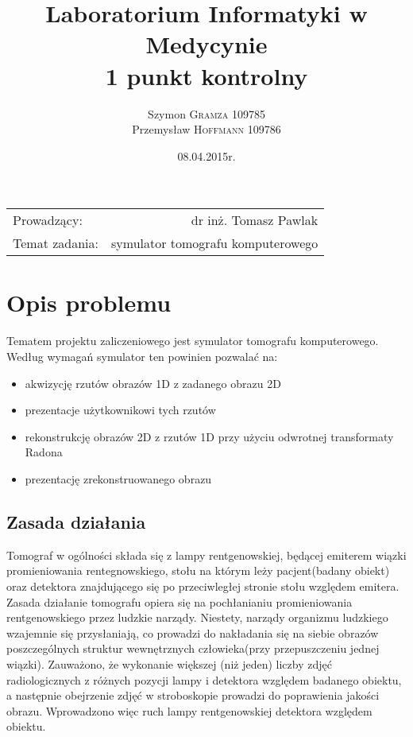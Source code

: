 \documentclass[A_4paper,12pt]{article}
\title{Laboratorium Informatyki w Medycynie \\ 1 punkt kontrolny} %
\author{Szymon \textsc{Gramza} 109785  \\ Przemysław \textsc{Hoffmann} 109786} %
\date{08.04.2015r.} %
\begin{document}
\maketitle %

\begin{center}
\begin{tabular}{l r}
Prowadzący: & dr inż. Tomasz Pawlak \\
Temat zadania: & symulator tomografu komputerowego
\end{tabular}
\end{center}

\newpage

\section{Opis problemu}
Tematem projektu zaliczeniowego jest symulator tomografu komputerowego.
Według wymagań symulator ten powinien pozwalać na:
\begin{itemize}
\item akwizycję rzutów obrazów 1D z zadanego obrazu 2D
\item prezentacje użytkownikowi tych rzutów
\item rekonstrukcję obrazów 2D z rzutów 1D przy użyciu odwrotnej transformaty Radona
\item prezentację zrekonstruowanego obrazu
\end{itemize}

\subsection{Zasada działania}
Tomograf w ogólności składa się z lampy rentgenowskiej, będącej emiterem wiązki promieniowania rentegnowskiego, stołu na którym leży pacjent(badany obiekt) oraz  detektora znajdującego się po przeciwległej stronie stołu względem emitera.
Zasada działanie tomografu opiera się na pochłanianiu promieniowania rentgenowskiego przez ludzkie narządy.
Niestety, narządy organizmu ludzkiego wzajemnie się przysłaniają, co prowadzi do nakładania się na siebie obrazów poszczególnych struktur wewnętrznych człowieka(przy przepuszczeniu jednej wiązki).
Zauważono, że wykonanie większej (niż jeden) liczby zdjęć radiologicznych z różnych pozycji lampy i detektora względem badanego obiektu, a następnie obejrzenie zdjęć w stroboskopie prowadzi do poprawienia jakości obrazu. Wprowadzono więc ruch lampy rentgenowskiej detektora względem obiektu.
\end{document}
